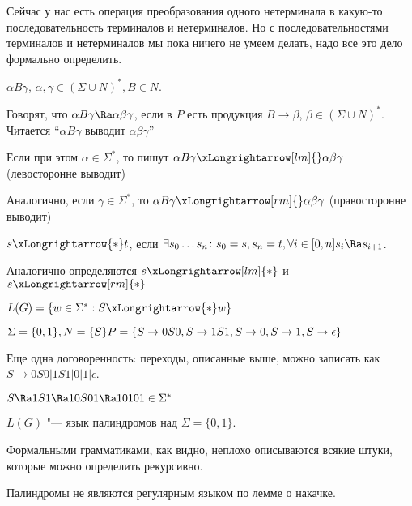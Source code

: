 Сейчас у нас есть операция преобразования одного нетерминала в какую-то последовательность терминалов и нетерминалов. 
Но с последовательностями терминалов и нетерминалов мы пока ничего не умеем делать, надо все это дело формально определить.

\begin{Def}        
    $\alpha B \gamma$, $\alpha, \gamma \in (\Sigma \cup N)^*, B \in N$.

    Говорят, что $\alpha B \gamma \Ra \alpha \beta \gamma$, если в $P$ есть продукция $B \to \beta$, $\beta \in (\Sigma \cup N)^*$. 
    Читается ``$\alpha B \gamma$ выводит $\alpha \beta \gamma$''
\end{Def}

\begin{Def}
    Если при этом $\alpha \in \Sigma^*$, то пишут
    $\alpha B \gamma \xLongrightarrow[lm]{} \alpha \beta \gamma$ (левосторонне выводит)

    Аналогично, если $\gamma \in \Sigma^*$, то
    $\alpha B \gamma \xLongrightarrow[rm]{} \alpha \beta \gamma$ (правосторонне выводит)
\end{Def}

\begin{Def}
$s \xLongrightarrow{*} t$, если $\exists s_0\dots s_n \colon s_0 = s, s_n = t, \forall i \in [0, n] s_i \Ra s_{i+1}$.

Аналогично определяются $s \xLongrightarrow[lm]{*}$ и $s \xLongrightarrow[rm]{*}$
\end{Def}

\begin{Def}
$L(G) = \{w \in \Sigma^*: S \xLongrightarrow{*} w\}$
\end{Def}

\begin{exmp}
$\Sigma = \{0, 1\}, N = \{S\} \\
P = \{S \to 0S0, S \to 1S1, S \to 0, S \to 1, S \to \epsilon\}$

Еще одна договоренность: переходы, описанные выше, можно записать как $S \to 0S0|1S1|0|1|\epsilon$.

$S \Ra 1S1 \Ra 10S01 \Ra 10101 \in \Sigma^*$

$L(G)$ "--- язык палиндромов над $\Sigma = \{0, 1\}$.

Формальными грамматиками, как видно, неплохо описываются всякие штуки, которые можно определить рекурсивно.
\end{exmp}
\begin{Rem}
Палиндромы не являются регулярным языком по лемме о накачке.
\end{Rem}


